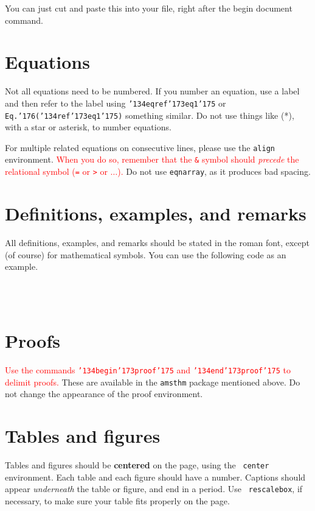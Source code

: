 \documentclass[12pt]{article}
\begin{document}
You can just cut and paste this into your file, right after the begin
document command.

\section{Equations}

Not all equations need to be numbered.  If you number an equation,
use a label and then refer to the label using
{\tt \char'134eqref\char'173eq1\char'175} or
{\tt Eq.\char'176(\char'134ref\char'173eq1\char'175)}
something similar.  Do not use things like (*), with a
star or asterisk, to number equations.

For multiple related equations on consecutive lines,
please use the {\tt align} environment.  \textcolor{red}{When you do so, remember
that the {\tt \&} symbol should {\it precede\/} the relational symbol
({\tt =} or {\tt >} or $\ldots$).}
Do not use {\tt eqnarray}, as it produces bad spacing.

\section{Definitions, examples, and remarks}

All definitions, examples, and remarks should be stated in the roman font,
except (of course) for 
mathematical symbols.  You can use the following code as an example.

 \\
 \\

\section{Proofs}

\textcolor{red}{Use the commands {\tt \char'134begin\char'173proof\char'175} and
{\tt \char'134end\char'173proof\char'175} to delimit proofs.}
These are available in the {\tt amsthm} package mentioned above.
Do not change the appearance of the proof environment.

\section{Tables and figures}

Tables and figures should be {\bf centered} on the page, using the {\tt
center} environment.  Each table and each figure should have a number.
Captions should appear {\it underneath} the table or figure, and
end in a period.  Use {\tt
rescalebox}, if necessary, to make sure your table fits properly on the
page.
\end{document}
